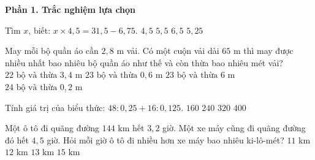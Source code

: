 \textbf{Phần 1. Trắc nghiệm lựa chọn}

\begin{ex} %
Tìm $x$, biết: $x \times 4{,}5 = 31{,}5 - 6{,}75$.
\choice
{$4{,}5$}
{\True $5{,}5$}
{$6{,}5$}
{$5{,}25$}
\end{ex}

\begin{ex} %
May mỗi bộ quần áo cần $2{,}8\text{ m}$ vải. Có một cuộn vải dài $65\text{ m}$ thì may được nhiều nhất bao nhiêu bộ quần áo như thế và còn thừa bao nhiêu mét vải?
\choice
{$22\text{ bộ và thừa }3{,}4\text{ m}$}
{\True $23\text{ bộ và thừa }0{,}6\text{ m}$}
{$23\text{ bộ và thừa }6\text{ m}$}
{$24\text{ bộ và thừa }0{,}2\text{ m}$}
\end{ex}

\begin{ex} %
Tính giá trị của biểu thức: $48 : 0{,}25 + 16 : 0{,}125$.
\choice
{$160$}
{$240$}
{\True $320$}
{$400$}
\end{ex}

\begin{ex} %
Một ô tô đi quãng đường $144\text{ km}$ hết $3{,}2$ giờ. Một xe máy cũng đi quãng đường đó hết $4{,}5$ giờ. Hỏi mỗi giờ ô tô đi nhiều hơn xe máy bao nhiêu ki-lô-mét?
\choice
{$11\text{ km}$}
{$12\text{ km}$}
{\True $13\text{ km}$}
{$15\text{ km}$}
\end{ex}

